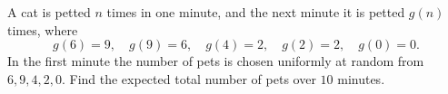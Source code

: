 A cat is petted $n$ times in one minute, and the next minute it is petted $g(n)$ times, where
\[g(6)=9,\quad g(9)=6,\quad g(4)=2,\quad g(2)=2,\quad g(0)=0.\]
In the first minute the number of pets is chosen uniformly at random from $6,9,4,2,0$. Find the expected total number of pets over $10$ minutes.
